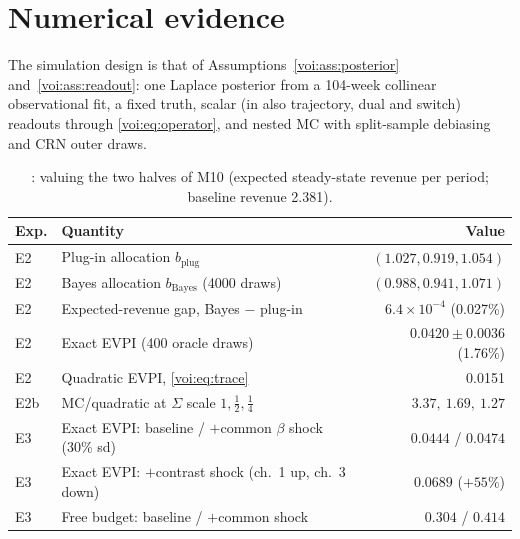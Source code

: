 \section{Numerical evidence}

The simulation design is that of Assumptions~\ref{voi:ass:posterior} and~\ref{voi:ass:readout}: one Laplace posterior from a 104-week collinear observational fit, a fixed truth, scalar (in  also trajectory, dual and switch) readouts through \cref{voi:eq:operator}, and nested MC with split-sample debiasing and CRN outer draws.

\begin{table}[htbp]
\centering\small
\caption{: valuing the two halves of M10 (expected steady-state revenue per period; baseline revenue 2.381).}
\label{voi:tab:evpi}
\begin{tabular}{llr}
\toprule
Exp. & Quantity & Value \\
\midrule
E2 & Plug-in allocation $b_{\mathrm{plug}}$ & $(1.027, 0.919, 1.054)$ \\
E2 & Bayes allocation $b_{\mathrm{Bayes}}$ (4000 draws) & $(0.988, 0.941, 1.071)$ \\
E2 & Expected-revenue gap, Bayes $-$ plug-in & $6.4\times10^{-4}$ (0.027\%) \\
E2 & Exact EVPI (400 oracle draws) & $0.0420 \pm 0.0036$ (1.76\%) \\
E2 & Quadratic EVPI, \cref{voi:eq:trace} & 0.0151 \\
E2b & MC/quadratic at $\Sigma$ scale $1, \tfrac12, \tfrac14$ & $3.37,\ 1.69,\ 1.27$ \\
E3 & Exact EVPI: baseline / $+$common $\beta$ shock (30\% sd) & $0.0444$ / $0.0474$ \\
E3 & Exact EVPI: $+$contrast shock (ch.\ 1 up, ch.\ 3 down) & $0.0689$ ($+55\%$) \\
E3 & Free budget: baseline / $+$common shock & $0.304$ / $0.414$ \\
\bottomrule
\end{tabular}
\end{table}

